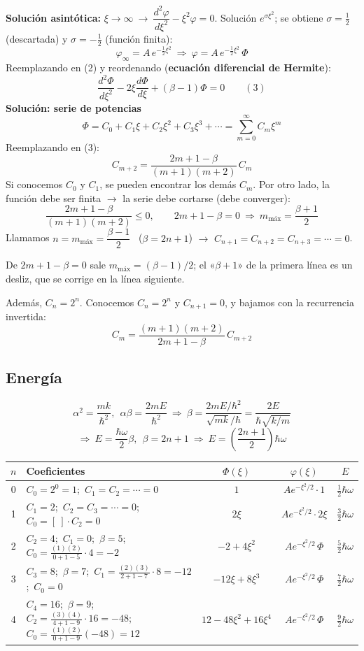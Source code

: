 \documentclass[11pt,a4paper]{article}
\begin{document}
\textbf{Solución asintótica:} $\xi\to\infty\ \rightarrow\ \dfrac{d^2\varphi}{d\xi^2}-\xi^2\varphi=0$. Solución $e^{\sigma\xi^2}$; se obtiene
$\sigma=\tfrac12$ (descartada) y $\sigma=-\tfrac12$ (función finita):
\[
\varphi_\infty=A\,e^{-\frac12\xi^2}\ \Rightarrow\ \varphi=A\,e^{-\frac12\xi^2}\,\Phi
\]
Reemplazando en (2) y reordenando (\textbf{ecuación diferencial de Hermite}):
\[
\frac{d^2\Phi}{d\xi^2}-2\xi\frac{d\Phi}{d\xi}+(\beta-1)\Phi=0\qquad(3)
\]
\textbf{Solución: serie de potencias}
\[
\Phi=C_0+C_1\xi+C_2\xi^2+C_3\xi^3+\cdots=\sum_{m=0}^{\infty}C_m\xi^m
\]
Reemplazando en (3):
\[
C_{m+2}=\frac{2m+1-\beta}{(m+1)(m+2)}\,C_m
\]
Si conocemos $C_0$ y $C_1$, se pueden encontrar los demás $C_m$. Por otro lado, la función debe ser finita $\rightarrow$ la
serie debe cortarse (debe converger):
\[
\frac{2m+1-\beta}{(m+1)(m+2)}\le0,\qquad 2m+1-\beta=0\ \Rightarrow\ m_{\text{máx}}=\frac{\beta+1}{2}
\]
Llamamos $n=m_{\text{máx}}=\dfrac{\beta-1}{2}$ \ ($\beta=2n+1$) $\rightarrow$ $C_{n+1}=C_{n+2}=C_{n+3}=\cdots=0$.

\begin{obs}
De $2m+1-\beta=0$ sale $m_{\text{máx}}=(\beta-1)/2$; el «$\beta+1$» de la primera línea es un desliz, que se corrige en la
línea siguiente.
\end{obs}

Además, $C_n=2^n$. Conocemos $C_n=2^n$ y $C_{n+1}=0$, y bajamos con la recurrencia invertida:
\[
C_m=\frac{(m+1)(m+2)}{2m+1-\beta}\,C_{m+2}
\]

\subsection{Energía}
\[
\alpha^2=\frac{mk}{\hbar^2},\ \ \alpha\beta=\frac{2mE}{\hbar^2}
\ \Rightarrow\
\beta=\frac{2mE/\hbar^2}{\sqrt{mk}/\hbar}=\frac{2E}{\hbar\sqrt{k/m}}
\]
\[
\Rightarrow\
E=\frac{\hbar\omega}{2}\beta,\ \ \beta=2n+1
\ \Rightarrow\
\boxed{E=\left(\frac{2n+1}{2}\right)\hbar\omega}
\]

\begin{center}
\renewcommand{\arraystretch}{1.3}
\footnotesize
\setlength{\tabcolsep}{4pt}
\begin{tabular}{clccc}
\toprule
$n$ & Coeficientes & $\Phi(\xi)$ & $\varphi(\xi)$ & $E$\\
\midrule
0 & $C_0=2^0=1$;\ $C_1=C_2=\cdots=0$ & $1$ & $Ae^{-\xi^2/2}\cdot1$ & $\tfrac12\hbar\omega$\\
1 & $C_1=2$;\ $C_2=C_3=\cdots=0$;\ $C_0=[\ ]\cdot C_2=0$ & $2\xi$ & $Ae^{-\xi^2/2}\cdot2\xi$ & $\tfrac32\hbar\omega$\\
2 & $C_2=4$;\ $C_1=0$;\ $\beta=5$;\ $C_0=\frac{(1)(2)}{0+1-5}\cdot4=-2$ & $-2+4\xi^2$ & $Ae^{-\xi^2/2}\,\Phi$ & $\tfrac52\hbar\omega$\\
3 & $C_3=8$;\ $\beta=7$;\ $C_1=\frac{(2)(3)}{2+1-7}\cdot8=-12$;\ $C_0=0$ & $-12\xi+8\xi^3$ & $Ae^{-\xi^2/2}\,\Phi$ & $\tfrac72\hbar\omega$\\
4 & $C_4=16$;\ $\beta=9$;\ $C_2=\frac{(3)(4)}{4+1-9}\cdot16=-48$;\ $C_0=\frac{(1)(2)}{0+1-9}(-48)=12$ & $12-48\xi^2+16\xi^4$ & $Ae^{-\xi^2/2}\,\Phi$ & $\tfrac92\hbar\omega$\\
\bottomrule
\end{tabular}
\end{center}
\end{document}
